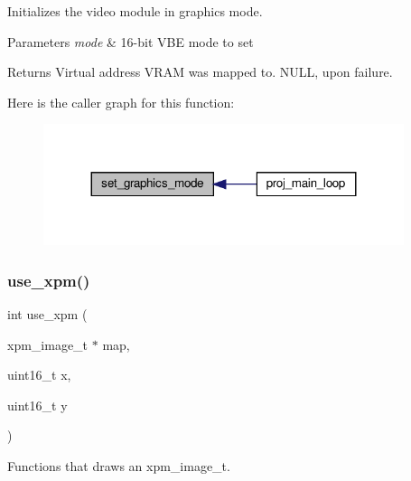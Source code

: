 Initializes the video module in graphics mode. 


\begin{DoxyParams}{Parameters}
{\em mode} & 16-\/bit V\+BE mode to set \\
\hline
\end{DoxyParams}
\begin{DoxyReturn}{Returns}
Virtual address V\+R\+AM was mapped to. N\+U\+LL, upon failure. 
\end{DoxyReturn}
Here is the caller graph for this function\+:
\nopagebreak
\begin{figure}[H]
\begin{center}
\leavevmode
\includegraphics[width=299pt]{group__video__card_ga430711ee8dd8b9944c9393b6f333f48d_icgraph}
\end{center}
\end{figure}
\mbox{\label{group__video__card_gacfacfc0ba6b20cfe99f211e93870bc4c}} 
\subsubsection{\texorpdfstring{use\+\_\+xpm()}{use\_xpm()}}
{\footnotesize\ttfamily int use\+\_\+xpm (\begin{DoxyParamCaption}\item[{xpm\+\_\+image\+\_\+t $\ast$}]{map,  }\item[{uint16\+\_\+t}]{x,  }\item[{uint16\+\_\+t}]{y }\end{DoxyParamCaption})}



Functions that draws an xpm\+\_\+image\+\_\+t. 


